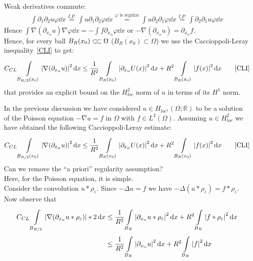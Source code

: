 Weak derivatives commute:
\begin{gather}
	\int \partial_{1}\partial_{2} u \varphi  \dd{x} \overset{I.P.}{=} \int u \partial_{1} \partial_{2} \varphi  \dd{x} \overset{\varphi \text{ is regular}}{=} \int u \partial_{2}\partial_{1} \varphi \dd{x} \overset{I.P.}{=} \int \partial_{2}\partial_{1}u \varphi \dd{x}
\end{gather}
Hence \( \int \nabla (\partial_{x_{\alpha }}u) \nabla \varphi  \dd{x} = -\int f \partial_{x_{\alpha }}\varphi  \dd{x} \) or \( -\nabla (\partial_{x_{\alpha }}u) = \partial_{x_{\alpha}}f \).\\
Hence, for every ball \( B_{R} (x_{0}) \ssubset \Omega  \) (\( \overline{B_{R} (x_{0})} \subset \Omega  \)) we use the Caccioppoli-Leray inequality~\eqref{CLI}  to get:
\begin{gather}
	C_{CL} \int\limits_{B_{\frac{R}{2}}(x_{0})}^{} \abs{\nabla (\partial_{x_{\alpha }}u) }^{2} \dd{x} \leq \frac{1}{R^{2}} \int\limits_{B_{R}(x_{0})}^{} \abs{\partial_{x_{\alpha }}U(x) }^{2} \dd{x} + R^{2} \int\limits_{B_{R}(x_{0})}^{} \abs{f(x) }^{2} \dd{x} \qquad \text{\eqref{CLI}}
\end{gather}
that provides an explicit bound on the \( H_{loc}^{2} \) norm of \( u \) in terms of its \( H^{1} \) norm.\\
\par
In the previous discussion we have considered \( u \in H_{loc^{1}}(\Omega ; \mathbb{R})  \) to be a solution of the Poisson equation \( -\nabla u = f \) in \( \Omega  \) with \( f \in L^{2}(\Omega ) \). Assuming \( u\in H_{loc}^{2} \) we have obtained the following Caccioppoli-Leray estimate:
\begin{gather}
	C_{CL} \int\limits_{B_{\frac{R}{2}}(x_{0})}^{} \abs{\nabla (\partial_{x_{\alpha }}u) }^{2} \dd{x} \leq \frac{1}{R^{2}} \int\limits_{B_{R}(x_{0})}^{} \abs{\partial_{x_{\alpha }}U(x) }^{2} \dd{x} + R^{2} \int\limits_{B_{R}(x_{0})}^{} \abs{f(x) }^{2} \dd{x} \qquad \text{\eqref{CLI}}
\end{gather}
Can we remove the \enquote{a priori} regularity assumption?\\
Here, for the Poisson equation, it is simple.\\
Consider the convolution \( u \ast \rho_{\varepsilon } \). Since \( -\Delta  u = f \) we have \( -\Delta  (u \ast \rho_{\varepsilon }) = f\ast \rho _{\varepsilon }\).\\
Now observe that
\begin{align}
	C_{CL} \int\limits_{B_{\frac{R}{2}}}^{} \abs{\nabla (\partial_{x_{\alpha }}u\ast \rho _{\varepsilon })}*2 \dd{x} & \leq \frac{1}{R^{2}}\int\limits_{B_{R}}^{} \abs{\partial_{x_{\alpha }}u \ast \rho _{\varepsilon }}^{2} \dd{x} + R^{2}\int\limits_{B_{R}}^{} \abs{f\ast \rho _{\varepsilon }}^{2} \dd{x} \\
	                                                                                                                 & \leq  \frac{1}{R^{2}} \int\limits_{B_{R}}^{} \abs{\partial_{x_{\alpha }}u}^{2} \dd{x} + R^{2} \int\limits_{B_{R}}^{} \abs{f}^{2} \dd{x}
\end{align}

